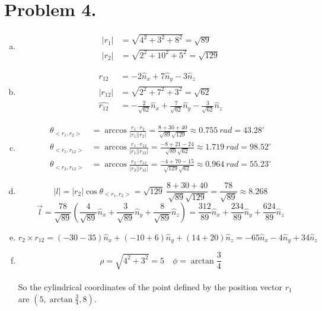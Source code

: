 \documentclass{article}
\begin{document}
\section*{Problem 4.}

\begin{enumerate}[(a)]
\item
\begin{align*}
|r_1|&=\sqrt{4^2+3^2+8^2}=\sqrt{89}\\
|r_2|&=\sqrt{2^2+10^2+5^2}=\sqrt{129}
\end{align*}

\item
\begin{align*}
r_{12}&=-2\hat{n}_x+7\hat{n}_y-3\hat{n}_z\\
|r_{12}|&=\sqrt{2^2+7^2+3^2}=\sqrt{62}\\
\hat{r_{12}}&=-\frac{2}{\sqrt{62}}\hat{n}_x+\frac{7}{\sqrt{62}}\hat{n}_y-\frac{3}{\sqrt{62}}\hat{n}_z
\end{align*}

\item
\begin{align*}
\theta_{<r_1,r_2>}&=\arccos\frac{r_1\cdot r_2}{|r_1||r_2|}=\frac{8+30+40}{\sqrt{89}\sqrt{129}}\approx 0.755\ rad=43.28^{\circ}\\
\theta_{<r_1,r_{12}>}&=\arccos\frac{r_1\cdot r_{12}}{|r_1||r_{12}|}=\frac{-8+21-24}{\sqrt{89}\sqrt{62}}\approx 1.719\ rad=98.52^{\circ}\\
\theta_{<r_2,r_{12}>}&=\arccos\frac{r_2\cdot r_{12}}{|r_2||r_{12}|}=\frac{-4+70-15}{\sqrt{129}\sqrt{62}}\approx 0.964\ rad=55.23^{\circ}
\end{align*}

\item
$$|l|=|r_2|\cos\theta_{<r_1,r_2>}=\sqrt{129}\ \frac{8+30+40}{\sqrt{89}\sqrt{129}}=\frac{78}{\sqrt{89}}\approx 8.268$$
$$\overrightarrow{l}=\frac{78}{\sqrt{89}}\left(\frac{4}{\sqrt{89}}\hat{n}_x+\frac{3}{\sqrt{89}}\hat{n}_y+\frac{8}{\sqrt{89}}\hat{n}_z\right)=\frac{312}{89}\hat{n}_x+\frac{234}{89}\hat{n}_y+\frac{624}{89}\hat{n}_z$$
\item
$$r_2\times r_{12}=(-30-35)\hat{n}_x+(-10+6)\hat{n}_y+(14+20)\hat{n}_z=-65\hat{n}_x-4\hat{n}_y+34\hat{n}_z$$
\item
$$\rho=\sqrt{4^2+3^2}=5\quad\phi=\arctan\frac{3}{4}$$\\
So the cylindrical coordinates of the point defined by the position vector $r_1$ are $(5,\arctan\frac{3}{4},8)$.
\end{enumerate}
\end{document}

